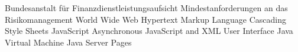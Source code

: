 \begin{acronym}[MaRisk]
		{Bundesanstalt für Finanzdienstleistungsaufsicht}
		{Mindestanforderungen an das Risikomanagement}
			{World Wide Web}
			{Hypertext Markup Language}
			{Cascading Style Sheets}
			{JavaScript}
			{Asynchronous JavaScript and XML}
			{User Interface}
			{Java Virtual Machine}
			{Java Server Pages}
\end{acronym}
